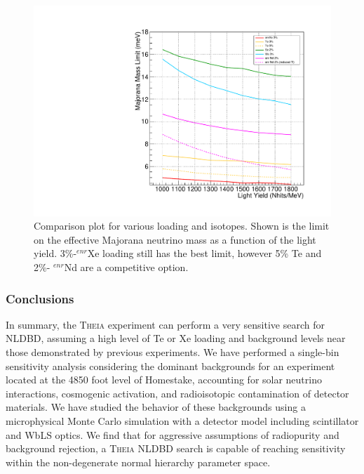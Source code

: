 \begin{figure}
\includegraphics[scale=0.6]{dbd/ly_comparison_mass.pdf} 
\caption{Comparison plot for various loading and isotopes. Shown is the limit on the effective Majorana neutrino mass as a function of the light yield.  3\%-$^{enr}$Xe loading still has the best limit, however 5\% Te and 2\%- $^{enr}$Nd are a competitive option. \label{fig::dbd::LY}}
\end{figure}


\subsubsection{Conclusions}
In summary, the \textsc{Theia} experiment can perform a very sensitive search
for NLDBD, assuming a high level of Te or Xe loading and background levels
near those demonstrated by previous experiments. We have performed a
single-bin sensitivity analysis considering the dominant backgrounds for
an experiment located at the 4850 foot level of Homestake, accounting
for solar neutrino interactions, cosmogenic activation, and radioisotopic
contamination of detector materials. We have studied the behavior of these
backgrounds using a microphysical Monte Carlo simulation with a detector
model including scintillator and WbLS optics. We find that for aggressive
assumptions of radiopurity and background rejection, a \textsc{Theia} NLDBD
search is capable of reaching sensitivity within the non-degenerate normal
hierarchy parameter space.

